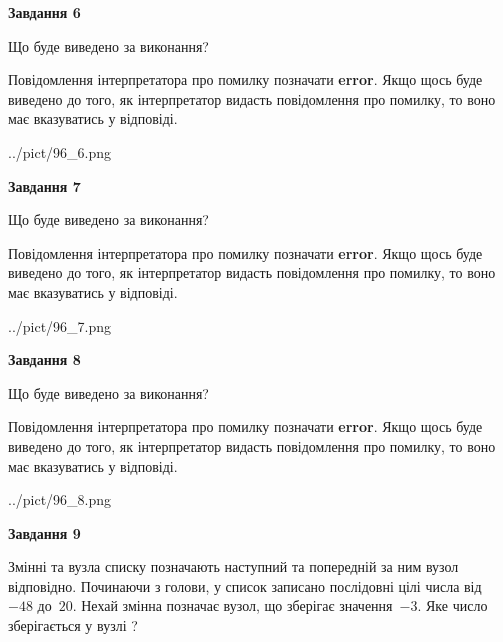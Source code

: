 \documentclass[12pt, ukrainian]{article}
\begin{document}
{\begin {large}
{\begin {center}\textbf{Завдання 6}\end {center}}\par
Що буде виведено за виконання?

Повідомлення інтерпретатора про помилку позначати \textbf{error}.
Якщо щось буде виведено до того, як інтерпретатор видасть повідомлення про помилку, 
то воно має вказуватись у відповіді. \par


\begin{center}
	{../pict/96_6.png}
\end{center}
\newpage

{\begin {center}\textbf{Завдання 7}\end {center}}\par
Що буде виведено за виконання?

Повідомлення інтерпретатора про помилку позначати \textbf{error}.
Якщо щось буде виведено до того, як інтерпретатор видасть повідомлення про помилку, 
то воно має вказуватись у відповіді. \par


\begin{center}
	{../pict/96_7.png}
\end{center}
\newpage

{\begin {center}\textbf{Завдання 8}\end {center}}\par
Що буде виведено за виконання?

Повідомлення інтерпретатора про помилку позначати \textbf{error}.
Якщо щось буде виведено до того, як інтерпретатор видасть повідомлення про помилку, 
то воно має вказуватись у відповіді. \par


\begin{center}
	{../pict/96_8.png}
\end{center}
\newpage

{\begin {center}\textbf{Завдання 9}\end {center}}\par
Змінні  та  вузла списку позначають наступний та попередній за ним вузол відповідно. Починаючи з голови, у список записано послідовні цілі числа від~$-48$ до~$20$. Нехай змінна  позначає вузол, що зберігає значення~$-3$.
Яке число зберігається у вузлі  ?\par
\newpage


\end{large}}
\end{document}
